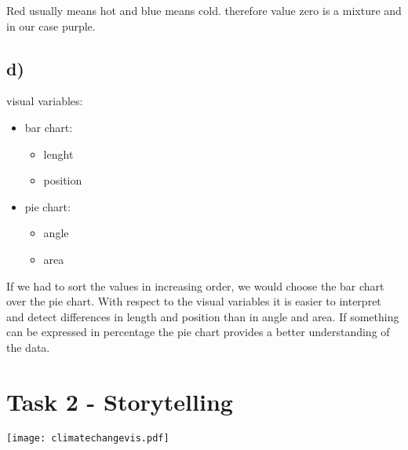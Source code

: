 \documentclass[a4paper]{article}
\begin{document}
\begin{itemize}
\begin{figure}[!h]
		\end{figure}
		Red usually means hot and blue means cold. therefore value zero is a mixture and in our case purple.
		
	\end{itemize}
	\subsection*{d)}
	
	visual variables:
	\begin{itemize}
		\item bar chart:
		\begin{itemize}
			\item lenght
			\item position
		\end{itemize}
		\item pie chart:
		\begin{itemize}
			\item angle
			\item area
		\end{itemize}
	\end{itemize}
	If we had to sort the values in increasing order, we would choose the bar chart over
	the pie chart. With respect to the visual variables it is easier to interpret and detect differences in length and position than in angle and area. If something can be expressed in percentage the pie chart provides a better understanding of the data.
	
	
	\section*{Task 2 - Storytelling}
	
	\texttt{[image: climatechangevis.pdf]}
	
	\newpage
	
	\begin{figure}[htb]
	\end{figure}
\end{document}
